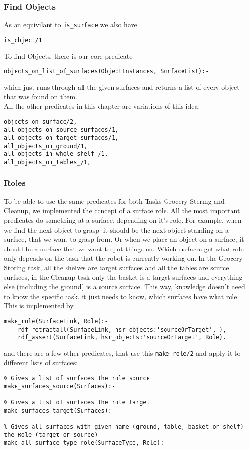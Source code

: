 \documentclass[main.tex]{subfiles}
\begin{document}
\subsubsection{Find Objects}
As an equivilant to \texttt{is\_surface} we also have
\begin{lstlisting}
is_object/1
\end{lstlisting}
To find Objects, there is our core predicate
\begin{lstlisting}
objects_on_list_of_surfaces(ObjectInstances, SurfaceList):-
\end{lstlisting}
which just runs through all the given surfaces and returns a list of every object that was found on them.\\
All the other predicates in this chapter are variations of this idea:
\begin{lstlisting}
objects_on_surface/2,
all_objects_on_source_surfaces/1,
all_objects_on_target_surfaces/1,
all_objects_on_ground/1,
all_objects_in_whole_shelf_/1,
all_objects_on_tables_/1,
\end{lstlisting}

\subsubsection{Roles}

To be able to use the same predicates for both Tasks Grocery Storing and Cleanup, we implemented the concept of a surface role. All the most important predicates do something at a surface, depending on it's role. For example, when we find the next object to grasp, it should be the next object standing on a surface, that we want to grasp from. Or when we place an object on a surface, it should be a surface that we want to put things on. Which surfaces get what role only depends on the task that the robot is currently working on. In the Grocery Storing task, all the shelves are target surfaces and all the tables are source surfaces, in the Cleanup task only the basket is a target surfaces and everything else (including the ground) is a source surface. This way, knowledge doesn't need to know the specific task, it just needs to know, which surfaces have what role.\\
This is implemented by 

\begin{lstlisting}
make_role(SurfaceLink, Role):-
    rdf_retractall(SurfaceLink, hsr_objects:'sourceOrTarget',_),
    rdf_assert(SurfaceLink, hsr_objects:'sourceOrTarget', Role).
\end{lstlisting}
and there are a few other predicates, that use this \texttt{make\_role/2} and apply it to different lists of surfaces:
\begin{lstlisting}
% Gives a list of surfaces the role source
make_surfaces_source(Surfaces):-

% Gives a list of surfaces the role target
make_surfaces_target(Surfaces):-

% Gives all surfaces with given name (ground, table, basket or shelf) the Role (target or source)
make_all_surface_type_role(SurfaceType, Role):-
\end{lstlisting}
\end{document}
